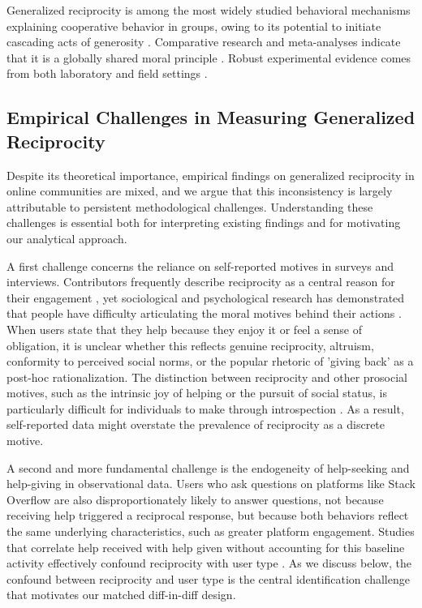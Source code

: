 Generalized reciprocity is among the most widely studied behavioral mechanisms explaining cooperative behavior in groups, owing to its potential to initiate cascading acts of generosity \citep{fowler_cooperative_2010, boyd_evolution_1989}. Comparative research and meta-analyses indicate that it is a globally shared moral principle \citep{curry_is_2019}. Robust experimental evidence comes from both laboratory \citep{greiner_indirect_2005, molm_building_2007, stanca_measuring_2009} and field settings \citep{mujcic_indirect_2018, fowler_cooperative_2010}.

\subsection{Empirical Challenges in Measuring Generalized Reciprocity}

Despite its theoretical importance, empirical findings on generalized reciprocity in online communities are mixed, and we argue that this inconsistency is largely attributable to persistent methodological challenges. Understanding these challenges is essential both for interpreting existing findings and for motivating our analytical approach.

A first challenge concerns the reliance on self-reported motives in surveys and interviews. Contributors frequently describe reciprocity as a central reason for their engagement \citep{wasko_it_2000, lakhani_how_2003}, yet sociological and psychological research has demonstrated that people have difficulty articulating the moral motives behind their actions \citep{vaisey_motivation_2009, mcclelland_how_1989}. When users state that they help because they enjoy it or feel a sense of obligation, it is unclear whether this reflects genuine reciprocity, altruism, conformity to perceived social norms, or the popular rhetoric of 'giving back' as a post-hoc rationalization. The distinction between reciprocity and other prosocial motives, such as the intrinsic joy of helping or the pursuit of social status, is particularly difficult for individuals to make through introspection \citep{batson1991altruism, benabou_incentives_2006}. As a result, self-reported data might overstate the prevalence of reciprocity as a discrete motive.

A second and more fundamental challenge is the endogeneity of help-seeking and help-giving in observational data. Users who ask questions on platforms like Stack Overflow are also disproportionately likely to answer questions, not because receiving help triggered a reciprocal response, but because both behaviors reflect the same underlying characteristics, such as greater platform engagement. Studies that correlate help received with help given without accounting for this baseline activity effectively confound reciprocity with user type \citep{baker_paying_2014, chen_engaging_2018, joyce_predicting_2006}. As we discuss below, the confound between reciprocity and user type is the central identification challenge that motivates our matched diff-in-diff design.

